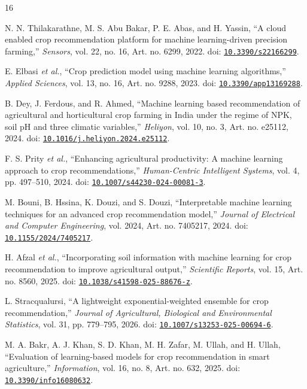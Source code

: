 \documentclass[conference]{IEEEtran}
\begin{document}
\begin{thebibliography}{16}

N. N. Thilakarathne, M. S. Abu Bakar, P. E. Abas, and H. Yassin, ``A cloud enabled crop recommendation platform for machine learning-driven precision farming,'' \emph{Sensors}, vol. 22, no. 16, Art. no. 6299, 2022. doi: \href{https://doi.org/10.3390/s22166299}{\nolinkurl{10.3390/s22166299}}.

E. Elbasi \emph{et al.}, ``Crop prediction model using machine learning algorithms,'' \emph{Applied Sciences}, vol. 13, no. 16, Art. no. 9288, 2023. doi: \href{https://doi.org/10.3390/app13169288}{\nolinkurl{10.3390/app13169288}}.

B. Dey, J. Ferdous, and R. Ahmed, ``Machine learning based recommendation of agricultural and horticultural crop farming in India under the regime of NPK, soil pH and three climatic variables,'' \emph{Heliyon}, vol. 10, no. 3, Art. no. e25112, 2024. doi: \href{https://doi.org/10.1016/j.heliyon.2024.e25112}{\nolinkurl{10.1016/j.heliyon.2024.e25112}}.

F. S. Prity \emph{et al.}, ``Enhancing agricultural productivity: A machine learning approach to crop recommendations,'' \emph{Human-Centric Intelligent Systems}, vol. 4, pp. 497--510, 2024. doi: \href{https://doi.org/10.1007/s44230-024-00081-3}{\nolinkurl{10.1007/s44230-024-00081-3}}.

M. Bouni, B. Hssina, K. Douzi, and S. Douzi, ``Interpretable machine learning techniques for an advanced crop recommendation model,'' \emph{Journal of Electrical and Computer Engineering}, vol. 2024, Art. no. 7405217, 2024. doi: \href{https://doi.org/10.1155/2024/7405217}{\nolinkurl{10.1155/2024/7405217}}.

H. Afzal \emph{et al.}, ``Incorporating soil information with machine learning for crop recommendation to improve agricultural output,'' \emph{Scientific Reports}, vol. 15, Art. no. 8560, 2025. doi: \href{https://doi.org/10.1038/s41598-025-88676-z}{\nolinkurl{10.1038/s41598-025-88676-z}}.

L. Stracqualursi, ``A lightweight exponential-weighted ensemble for crop recommendation,'' \emph{Journal of Agricultural, Biological and Environmental Statistics}, vol. 31, pp. 779--795, 2026. doi: \href{https://doi.org/10.1007/s13253-025-00694-6}{\nolinkurl{10.1007/s13253-025-00694-6}}.

M. A. Bakr, A. J. Khan, S. D. Khan, M. H. Zafar, M. Ullah, and H. Ullah, ``Evaluation of learning-based models for crop recommendation in smart agriculture,'' \emph{Information}, vol. 16, no. 8, Art. no. 632, 2025. doi: \href{https://doi.org/10.3390/info16080632}{\nolinkurl{10.3390/info16080632}}.


\end{thebibliography}
\end{document}
